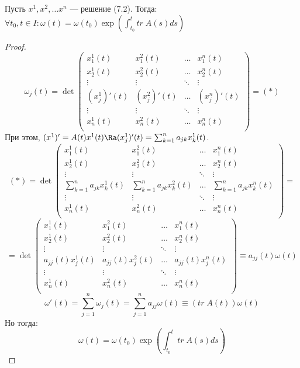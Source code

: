 \begin{theorem}
    Пусть \(x^1, x^2, \dots x^n\) --- решение (7.2). Тогда: \(\forall t_0, t \in I: \omega(t) = \omega(t_0)\exp\left( \int_{t_0}^t tr\;A(s) ds \right)\)
\end{theorem}
\begin{proof}
    \[\omega_j(t) = \det\left( \begin{array}{cccc}
        x_1^1(t) & x_1^2(t) & \dots & x_1^n(t) \\
        x_2^1(t) & x_2^2(t) & \dots & x_2^n(t) \\
        \vdots & \vdots & \ddots & \vdots \\
        (x_j^1)'(t) & (x_j^2)'(t) & \dots & (x_j^n)'(t) \\
        \vdots & \vdots & \ddots & \vdots \\
        x_n^1(t) & x_n^2(t) & \dots & x_n^n(t) \\
    \end{array} \right) = (*)\]
    При этом, \((x^1)' = A(t)x^1(t) \Ra (x_j^1)'(t) = \sum_{k = 1}^n a_{jk}x_k^1(t)\).
    \[(*) = \det\left( \begin{array}{cccc}
        x_1^1(t) & x_1^2(t) & \dots & x_1^n(t) \\
        x_2^1(t) & x_2^2(t) & \dots & x_2^n(t) \\
        \vdots & \vdots & \ddots & \vdots \\
        \sum_{k = 1}^n a_{jk}x_k^1(t) & \sum_{k = 1}^n a_{jk}x_k^2(t) & \dots & \sum_{k = 1}^n a_{jk}x_k^n(t) \\
        \vdots & \vdots & \ddots & \vdots \\
        x_n^1(t) & x_n^2(t) & \dots & x_n^n(t) \\
    \end{array} \right) = \]
    \[ = \det\left( \begin{array}{cccc}
        x_1^1(t) & x_1^2(t) & \dots & x_1^n(t) \\
        x_2^1(t) & x_2^2(t) & \dots & x_2^n(t) \\
        \vdots & \vdots & \ddots & \vdots \\
        a_{jj}(t)x_j^1(t) & a_{jj}(t)x_j^2(t) & \dots & a_{jj}(t)x_j^n(t) \\
        \vdots & \vdots & \ddots & \vdots \\
        x_n^1(t) & x_n^2(t) & \dots & x_n^n(t) \\
    \end{array} \right) \equiv a_{jj}(t)\omega(t)\]
    \[\omega'(t) = \sum_{j = 1}^n \omega_j(t) = \sum_{j = 1}^n a_{jj}\omega(t) \equiv (tr\;A(t))\omega(t)\]
    Но тогда:
    \[\omega(t) = \omega(t_0)\exp\left( \int_{t_0}^t tr\;A(s) ds \right)\]
\end{proof}

